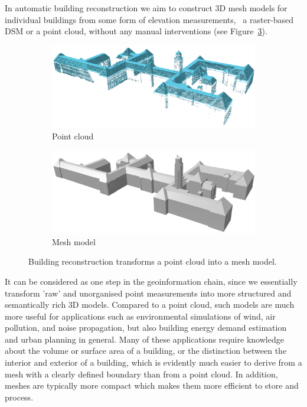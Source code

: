 In automatic building reconstruction we aim to construct 3D mesh models for individual buildings from some form of elevation measurements, \ie\ a raster-based DSM or a point cloud, without any manual interventions (see Figure~\ref{fig:bk-building-recon}).
\begin{figure}
	\centering
	\begin{subfigure}[b]{0.45\linewidth}
		\includegraphics[width=\linewidth]{figs/bk-pointcloud.png}
		\caption{Point cloud}%
		\label{subfig:bk-pc}
	\end{subfigure}
	\quad
	\begin{subfigure}[b]{0.45\linewidth}
		\includegraphics[width=\linewidth]{figs/bk-mesh.png}
		\caption{Mesh model}%
		\label{subfig:bk-mesh}
	\end{subfigure}
	\caption{Building reconstruction transforms a point cloud into a mesh model.}%
	\label{fig:bk-building-recon}
\end{figure}
It can be considered as one step in the geoinformation chain, since we essentially transform 'raw' and unorganised point measurements into more structured and semantically rich 3D models.
Compared to a point cloud, such models are much more useful for applications such as environmental simulations of wind, air pollution, and noise propagation, but also building energy demand estimation and urban planning in general.
Many of these applications require knowledge about the volume or surface area of a building, or the distinction between the interior and exterior of a building, which is evidently much easier to derive from a mesh with a clearly defined boundary than from a point cloud.
In addition, meshes are typically more compact which makes them more efficient to store and process.

